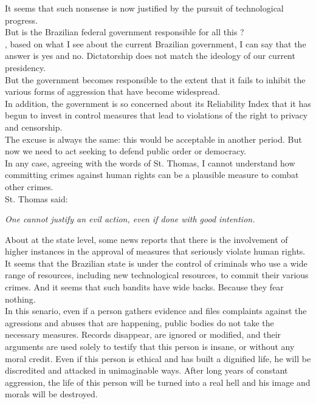 \documentclass[11pt]{book}
\begin{document}
\noindent It seems that such nonsense is now justified by the pursuit of technological progress. \\

\noindent But is the Brazilian federal government responsible for all this ? \\

, based on what I see about the current Brazilian government, I can say that the answer is yes and no. Dictatorship does not match the ideology of our current presidency. \\

\noindent  But the government becomes responsible to the extent that it fails to inhibit the various forms of aggression that have become widespread. \\

\noindent In addition, the government is so concerned about its Reliability Index that it has begun to invest in control measures that lead to violations of the right to privacy and censorship. \\

\noindent The excuse is always the same: this would be acceptable in another period. But now we need to act seeking to defend public order or democracy. \\

\noindent In any case, agreeing with the words of St. Thomas, I cannot understand how committing crimes against human rights can be a plausible measure to combat other crimes. \\

\noindent St. Thomas said:

\noindent \begin{center} \emph{One cannot justify an evil action, even if done with good intention.} \end{center}

\noindent About at the state level, some news reports that there is the involvement of higher instances in the approval of measures that seriously violate human rights.  \\

\noindent It seems that the Brazilian state is under the control of criminals who use a wide range of resources, including new technological resources, to commit their various crimes. And it seems that such bandits have wide backs. Because they fear nothing. \\

\noindent In this senario, even if a person gathers evidence and files complaints against the agressions and abuses that are happening, public bodies do not take the necessary measures. Records disappear, are ignored or modified, and their arguments are used solely to testify that this person is insane, or without any moral credit. Even if this person is ethical and has built a dignified life, he will be discredited and attacked in unimaginable ways. After long years of constant aggression, the life of this person will be turned into a real hell and his image and morals will be destroyed.  \\
\end{document}
